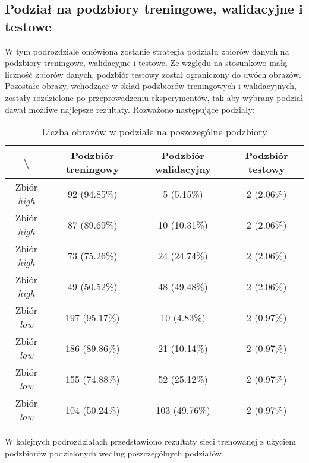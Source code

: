 \newpage
\subsection{Podział na podzbiory treningowe, walidacyjne i testowe}
\label{sec:podzial}
W tym podrozdziale omówiona zostanie strategia podziału zbiorów danych na podzbiory treningowe, walidacyjne i testowe.
Ze względu na stosunkowo małą liczność zbiorów danych, podzbiór testowy został ograniczony do dwóch obrazów.
Pozostałe obrazy, wchodzące w skład podzbiorów treningowych i walidacyjnych, zostały rozdzielone po przeprowadzeniu eksperymentów, tak aby wybrany podział dawał możliwe najlepsze rezultaty.
Rozważono następujące podziały:

\begin{table}[!h]
	\centering
	\caption{Liczba obrazów w podziale na poszczególne podzbiory}
	\vspace{6pt}
	{\footnotesize
		\begin{tabular}{|c|c|c|c|}
			\hline \textbackslash & Podzbiór treningowy & Podzbiór walidacyjny & Podzbiór testowy \\
      \hline Zbiór \textit{high} & 92 (94.85\%) & 5 (5.15\%) & 2 (2.06\%) \\
      \hline Zbiór \textit{high} & 87 (89.69\%) & 10 (10.31\%) & 2 (2.06\%) \\
      \hline Zbiór \textit{high} & 73 (75.26\%) & 24 (24.74\%) & 2 (2.06\%) \\
      \hline Zbiór \textit{high} & 49 (50.52\%) & 48 (49.48\%) & 2 (2.06\%) \\
      \hline Zbiór \textit{low} & 197 (95.17\%) & 10 (4.83\%) & 2 (0.97\%) \\
      \hline Zbiór \textit{low} & 186 (89.86\%) & 21 (10.14\%) & 2 (0.97\%) \\
      \hline Zbiór \textit{low} & 155 (74.88\%) & 52 (25.12\%) & 2 (0.97\%) \\
      \hline Zbiór \textit{low} & 104 (50.24\%) & 103 (49.76\%) & 2 (0.97\%) \\
      \hline
		\end{tabular}
	}
	\vspace{0pt}
\end{table}


W kolejnych podrozdziałach przedstawiono rezultaty sieci trenowanej z użyciem podzbiorów podzielonych według poszczególnych podziałów.

